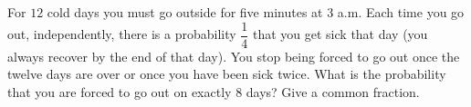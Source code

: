 For $12$ cold days you must go outside for five minutes at 3 a.m. Each time you go out, independently, there is a probability $\dfrac14$ that you get sick that day (you always recover by the end of that day). You stop being forced to go out once the twelve days are over or once you have been sick twice. What is the probability that you are forced to go out on exactly $8$ days? Give a common fraction.
